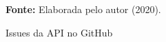 \begin{figure}[ht!]
\centering

\caption{\textmd{Issues da \gls{API} no GitHub}}
\label{fig:issues}

\par\medskip\textbf{Fonte:} Elaborada pelo autor (2020). \par\medskip

\end{figure}
